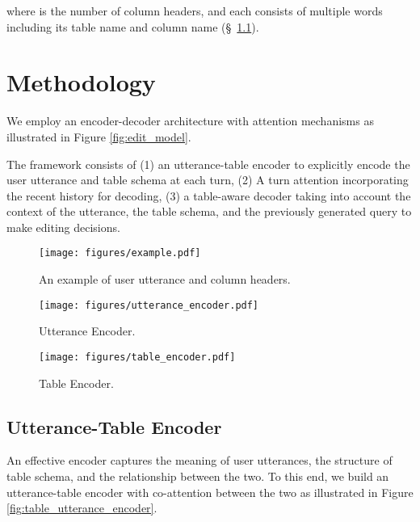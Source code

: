 \documentclass[11pt,a4paper]{article}
\newcommand{\hide}[1]{}
\begin{document}
where  is the number of column headers, and each  consists of multiple words including its table name and column name (\S~\ref{sec:utterance-table-encoder}).

\section{Methodology}
We employ an encoder-decoder architecture with attention mechanisms \cite{sutskever2014sequence,luong2015effective} as illustrated in Figure \ref{fig:edit_model}.
\hide{
While based on \newcite{suhr2018learning}, our model has differences including
}
The framework consists of (1) an utterance-table encoder to explicitly encode the user utterance and table schema at each turn, (2) A turn attention incorporating the recent history for decoding, (3) a table-aware decoder taking into account the context of the utterance, the table schema, and the previously generated query to make editing decisions.

\begin{figure*}[t!]
     \centering
     \begin{subfigure}[b]{0.45\textwidth}
         \centering
         \texttt{[image: figures/example.pdf]}
         \caption{An example of user utterance and column headers.}
         \label{fig:example}
     \end{subfigure} \hfill
     \begin{subfigure}[b]{0.45\textwidth}
         \centering
         \texttt{[image: figures/utterance\_encoder.pdf]}
         \caption{Utterance Encoder.}
         \label{fig:utterance_encoder}
     \end{subfigure} \hfill
     \vfill
     \vspace{3mm}
     \begin{subfigure}[b]{\textwidth}
         \centering
         \texttt{[image: figures/table\_encoder.pdf]}
         \caption{Table Encoder.}
         \label{fig:table_encoder}
     \end{subfigure}
\caption{Utterance-Table Encoder for the example in (a).}
\vspace{-3mm}
\label{fig:table_utterance_encoder}
\end{figure*}

\subsection{Utterance-Table Encoder}
\label{sec:utterance-table-encoder}
An effective encoder captures the meaning of user utterances, the structure of table schema, and the relationship between the two.
To this end, we build an utterance-table encoder with co-attention between the two as illustrated in Figure \ref{fig:table_utterance_encoder}.
\end{document}
